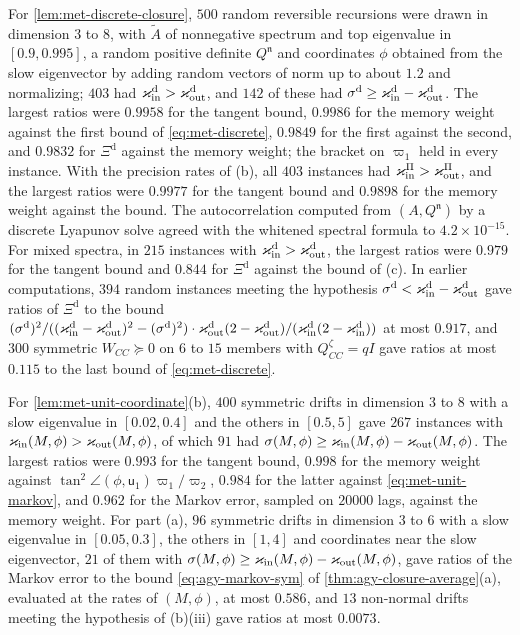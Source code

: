 \begin{numcheck}\label{chk:met-lemmas}
For \cref{lem:met-discrete-closure}, $500$ random reversible recursions were drawn in dimension $3$ to $8$, with $\tilde A$ of nonnegative spectrum and top eigenvalue in $[0.9,0.995]$, a random positive definite $Q^{\mathfrak n}$ and coordinates $\phi$ obtained from the slow eigenvector by adding random vectors of norm up to about $1.2$ and normalizing; $403$ had $\varkappa_{\mathrm{in}}^{\mathrm d}>\varkappa_{\mathrm{out}}^{\mathrm d}$, and $142$ of these had $\sigma^{\mathrm d}\ge\varkappa_{\mathrm{in}}^{\mathrm d}-\varkappa_{\mathrm{out}}^{\mathrm d}$. The largest ratios were $0.9958$ for the tangent bound, $0.9986$ for the memory weight against the first bound of \eqref{eq:met-discrete}, $0.9849$ for the first against the second, and $0.9832$ for $\Xi^{\mathrm d}$ against the memory weight; the bracket on $\varpi_1$ held in every instance. With the precision rates of (b), all $403$ instances had $\varkappa_{\mathrm{in}}^\Pi>\varkappa_{\mathrm{out}}^\Pi$, and the largest ratios were $0.9977$ for the tangent bound and $0.9898$ for the memory weight against the bound. The autocorrelation computed from $(A,Q^{\mathfrak n})$ by a discrete Lyapunov solve agreed with the whitened spectral formula to $4.2\times10^{-15}$. For mixed spectra, in $215$ instances with $\varkappa_{\mathrm{in}}^{\mathrm d}>\varkappa_{\mathrm{out}}^{\mathrm d}$, the largest ratios were $0.979$ for the tangent bound and $0.844$ for $\Xi^{\mathrm d}$ against the bound of (c). In earlier computations, $394$ random instances meeting the hypothesis $\sigma^{\mathrm d}<\varkappa_{\mathrm{in}}^{\mathrm d}-\varkappa_{\mathrm{out}}^{\mathrm d}$ gave ratios of $\Xi^{\mathrm d}$ to the bound $(\sigma^{\mathrm d})^2/((\varkappa_{\mathrm{in}}^{\mathrm d}-\varkappa_{\mathrm{out}}^{\mathrm d})^2-(\sigma^{\mathrm d})^2)\cdot\varkappa_{\mathrm{out}}^{\mathrm d}(2-\varkappa_{\mathrm{out}}^{\mathrm d})/(\varkappa_{\mathrm{in}}^{\mathrm d}(2-\varkappa_{\mathrm{in}}^{\mathrm d}))$ at most $0.917$, and $300$ symmetric $W_{CC}\succeq0$ on $6$ to $15$ members with $Q^\zeta_{CC}=qI$ gave ratios at most $0.115$ to the last bound of \eqref{eq:met-discrete}.

For \cref{lem:met-unit-coordinate}(b), $400$ symmetric drifts in dimension $3$ to $8$ with a slow eigenvalue in $[0.02,0.4]$ and the others in $[0.5,5]$ gave $267$ instances with $\varkappa_{\mathrm{in}}(M,\phi)>\varkappa_{\mathrm{out}}(M,\phi)$, of which $91$ had $\sigma(M,\phi)\ge\varkappa_{\mathrm{in}}(M,\phi)-\varkappa_{\mathrm{out}}(M,\phi)$. The largest ratios were $0.993$ for the tangent bound, $0.998$ for the memory weight against $\tan^2\angle(\phi,\mathsf u_1)\varpi_1/\varpi_2$, $0.984$ for the latter against \eqref{eq:met-unit-markov}, and $0.962$ for the Markov error, sampled on $20000$ lags, against the memory weight. For part (a), $96$ symmetric drifts in dimension $3$ to $6$ with a slow eigenvalue in $[0.05,0.3]$, the others in $[1,4]$ and coordinates near the slow eigenvector, $21$ of them with $\sigma(M,\phi)\ge\varkappa_{\mathrm{in}}(M,\phi)-\varkappa_{\mathrm{out}}(M,\phi)$, gave ratios of the Markov error to the bound \eqref{eq:agy-markov-sym} of \cref{thm:agy-closure-average}(a), evaluated at the rates of $(M,\phi)$, at most $0.586$, and $13$ non-normal drifts meeting the hypothesis of (b)(iii) gave ratios at most $0.0073$.
\end{numcheck}

